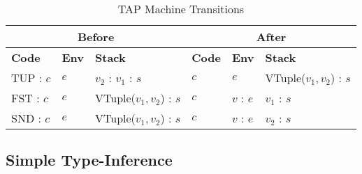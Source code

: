 \begin{table}[h]
    \centering
    \small
    \begin{tabular}{|l|l|l||l|l|l|}
        \hline
        \multicolumn{3}{|c||}{\textbf{Before}} & \multicolumn{3}{c|}{\textbf{After}} \\
        \hline
        \textbf{Code} & \textbf{Env} & \textbf{Stack} & \textbf{Code} & \textbf{Env} & \textbf{Stack} \\
        \hline
        TUP : \(c\) & \( e \) & \( v_2 \) : \( v_1 \) : \( s \) & \( c \) & \( e \) & VTuple(\( v_1, v_2 \)) : \( s \) \\
        FST : \(c\) & \( e \) & VTuple(\( v_1, v_2 \)) : \( s \) & \( c \) & \( v \) : \( e \) & \( v_1 \) : \( s \) \\
        SND : \(c\) & \( e \) & VTuple(\( v_1, v_2 \)) : \( s \) & \( c \) & \( v \) : \( e \) & \( v_2 \) : \( s \) \\
        \hline
    \end{tabular}
    \caption{TAP Machine Transitions}
\end{table}

\subsection{Simple Type-Inference}
